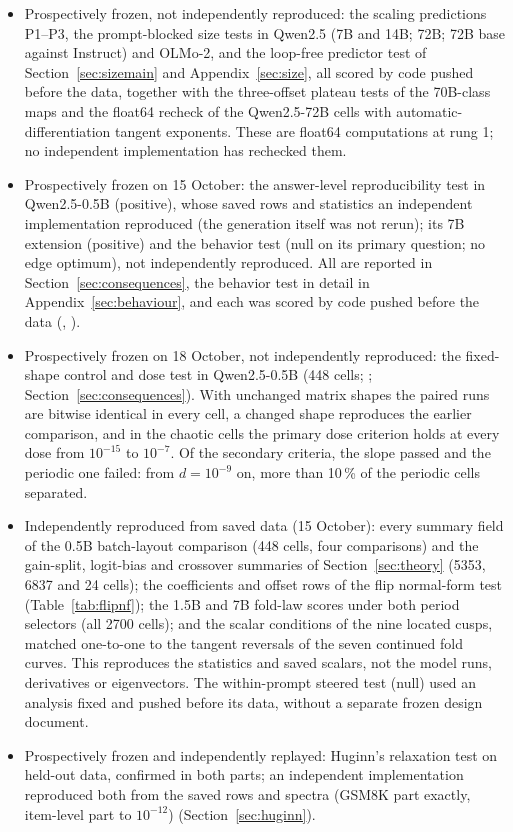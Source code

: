 \documentclass[11pt,letterpaper]{article}
\begin{document}
\begin{itemize}
  the 1.5B flips, the hostile windows' edges, the spiral region's period-7 body and the cascade inside it, the three 7B
  orbits, and Huginn's float32 spectral estimates.
\item Prospectively frozen, not independently reproduced: the scaling predictions P1--P3, the prompt-blocked size
  tests in Qwen2.5 (7B and 14B; 72B; 72B base against Instruct) and OLMo-2, and the loop-free predictor test of Section~\ref{sec:sizemain} and Appendix~\ref{sec:size}, all scored
  by code pushed before the data, together with the three-offset plateau tests of the 70B-class maps and the float64
  recheck of the Qwen2.5-72B cells with automatic-differentiation tangent exponents. These are
  float64 computations at rung 1; no independent implementation has rechecked them.
\item Prospectively frozen on 15 October: the answer-level reproducibility test in Qwen2.5-0.5B (positive), whose
  saved rows and statistics an independent implementation reproduced (the generation itself was not rerun); its 7B
  extension (positive) and the behavior test (null on its primary question; no edge optimum), not independently reproduced. All are reported in Section~\ref{sec:consequences}, the behavior test in detail in Appendix~\ref{sec:behaviour}, and each was scored by code pushed before the data
  (, ).
\item Prospectively frozen on 18 October, not independently reproduced: the fixed-shape control and dose test in
  Qwen2.5-0.5B (448 cells; ; Section~\ref{sec:consequences}). With unchanged matrix shapes the
  paired runs are bitwise identical in every cell, a changed shape reproduces the earlier comparison, and in the
  chaotic cells the primary dose criterion holds at every dose from $10^{-15}$ to $10^{-7}$. Of the secondary
  criteria, the slope passed and the periodic one failed: from $d=10^{-9}$ on, more than 10\,\% of the periodic
  cells separated.
\item Independently reproduced from saved data (15 October): every summary field of the 0.5B batch-layout comparison
  (448 cells, four comparisons) and the gain-split, logit-bias and crossover summaries of Section~\ref{sec:theory}
  (5353, 6837 and 24 cells); the coefficients and offset rows of the flip normal-form test (Table~\ref{tab:flipnf}); the
  1.5B and 7B fold-law scores under both period selectors (all 2700 cells); and the scalar conditions of the nine
  located cusps, matched one-to-one to the tangent reversals of the seven continued fold curves. This reproduces the
  statistics and saved scalars, not the model runs, derivatives or eigenvectors. The within-prompt steered test (null) used an analysis
  fixed and pushed before its data, without a separate frozen design document.
\item Prospectively frozen and independently replayed: Huginn's relaxation test on held-out data, confirmed in both
  parts; an independent implementation reproduced both from the saved rows and spectra (GSM8K part exactly,
  item-level part to $10^{-12}$) (Section~\ref{sec:huginn}).
\end{itemize}
\end{document}
